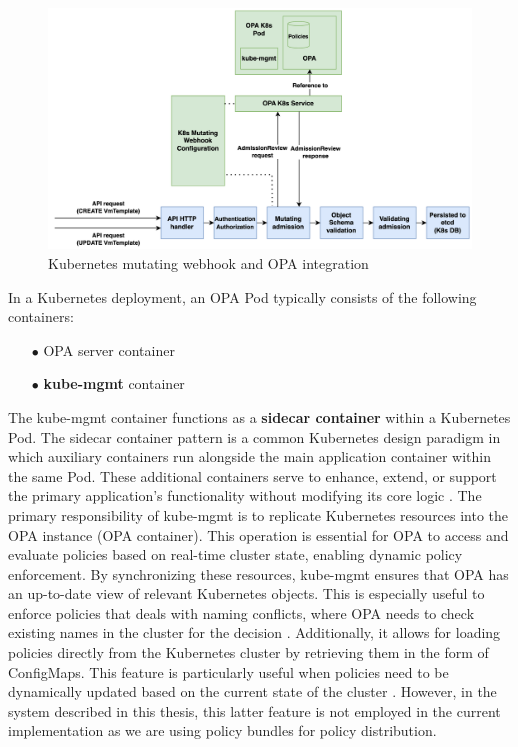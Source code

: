 
\begin{figure}[htb]
\centering
\includegraphics[width=1\linewidth]{images/webhook.png}
\caption{Kubernetes mutating webhook and OPA integration}
\label{fig:webhook_opa}
\end{figure}

In a Kubernetes deployment, an OPA Pod typically consists of the following containers:
\begin{itemize}[itemsep=0.2pt, topsep=1pt]
  \item[$\bullet$] OPA server container
  \item[$\bullet$] \textbf{kube-mgmt} container \\
\end{itemize} 

The kube-mgmt container functions as a \textbf{sidecar container} within a Kubernetes Pod. The sidecar container pattern is a common Kubernetes design paradigm in which auxiliary containers run alongside the main application container within the same Pod. These additional containers serve to enhance, extend, or support the primary application's functionality without modifying its core logic \cite{sidecar_containers}. 
The primary responsibility of kube-mgmt is to replicate Kubernetes resources into the OPA instance (OPA container). This operation is essential for OPA to access and evaluate policies based on real-time cluster state, enabling dynamic policy enforcement. By synchronizing these resources, kube-mgmt ensures that OPA has an up-to-date view of relevant Kubernetes objects.
This is especially useful to enforce policies that deals with naming conflicts, where OPA needs to check existing names in the cluster for the decision \cite{kube-mgmt}.
Additionally, it allows for loading policies directly from the Kubernetes cluster by retrieving them in the form of ConfigMaps. This feature is particularly useful when policies need to be dynamically updated based on the current state of the cluster \cite{kube-mgmt}. However, in the system described in this thesis, this latter feature is not employed in the current implementation as we are using policy bundles for policy distribution.

